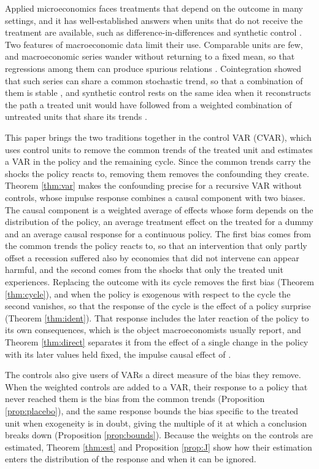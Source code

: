 \documentclass[12pt,a4paper]{article}
\theoremstyle{definition}
\theoremstyle{definition}\newtheorem{example}{Example}
\theoremstyle{definition}\newtheorem{definition}{Definition}
\begin{document}
Applied microeconomics faces treatments that depend on the outcome in many settings, and it has well-established answers when units that do not receive the treatment are available, such as difference-in-differences \citep{Card1990,CardKrueger,Abadie2005} and synthetic control \citep{AbadieGardeazabal2003,Abadie2010}. Two features of macroeconomic data limit their use. Comparable units are few, and macroeconomic series wander without returning to a fixed mean, so that regressions among them can produce spurious relations \citep{GrangerNewbold1974}. Cointegration showed that such series can share a common stochastic trend, so that a combination of them is stable \citep{EngleGranger1987,Johansen1991}, and synthetic control rests on the same idea when it reconstructs the path a treated unit would have followed from a weighted combination of untreated units that share its trends \citep{Abadie2015,HsiaoChingWan2012,Arkhangelsky2021}.

This paper brings the two traditions together in the control VAR (CVAR), which uses control units to remove the common trends of the treated unit and estimates a VAR in the policy and the remaining cycle. Since the common trends carry the shocks the policy reacts to, removing them removes the confounding they create. Theorem \ref{thm:var} makes the confounding precise for a recursive VAR without controls, whose impulse response combines a causal component with two biases. The causal component is a weighted average of effects whose form depends on the distribution of the policy, an average treatment effect on the treated for a dummy and an average causal response for a continuous policy. The first bias comes from the common trends the policy reacts to, so that an intervention that only partly offset a recession suffered also by economies that did not intervene can appear harmful, and the second comes from the shocks that only the treated unit experiences. Replacing the outcome with its cycle removes the first bias (Theorem \ref{thm:cycle}), and when the policy is exogenous with respect to the cycle the second vanishes, so that the response of the cycle is the effect of a policy surprise (Theorem \ref{thm:ident}). That response includes the later reaction of the policy to its own consequences, which is the object macroeconomists usually report, and Theorem \ref{thm:direct} separates it from the effect of a single change in the policy with its later values held fixed, the impulse causal effect of \citet{RambachanSheppard2021}.

The controls also give users of VARs a direct measure of the bias they remove. When the weighted controls are added to a VAR, their response to a policy that never reached them is the bias from the common trends (Proposition \ref{prop:placebo}), and the same response bounds the bias specific to the treated unit when exogeneity is in doubt, giving the multiple of it at which a conclusion breaks down (Proposition \ref{prop:bounds}). Because the weights on the controls are estimated, Theorem \ref{thm:est} and Proposition \ref{prop:J} show how their estimation enters the distribution of the response and when it can be ignored.
\end{document}
